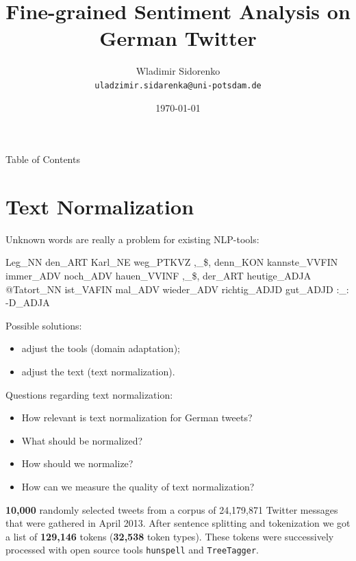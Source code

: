 \documentclass{beamer}
\title[Sentiment Analysis]{Fine-grained Sentiment Analysis on German Twitter}
\author[Sidorenko]{Wladimir Sidorenko\\ \texttt{uladzimir.sidarenka{@}uni-potsdam.de}}
\institute[Uni Potsdam]{University of Potsdam}
\date{\today}
\newcommand{\normquestions}[4]{
  Questions regarding text normalization:
  \begin{itemize}
    \item How relevant is text normalization for German tweets? \textit{#1}
    \item What should be normalized? \textit{#2}
    \item How should we normalize? \textit{#3}
    \item How can we measure the quality of text normalization? \textit{#4}
  \end{itemize}
}
\begin{document}
\begin{frame}{}
  \titlepage
\end{frame}

\begin{frame}{Table of Contents}
  \tableofcontents
\end{frame}

\section{Text Normalization}

\begin{frame}{}
  Unknown words are really a problem for existing NLP-tools:
  \begin{example}
    \alert{Leg\_NN} den\_ART Karl\_NE weg\_PTKVZ ,\_\$,
    \alert{denn\_KON} kannste\_VVFIN immer\_ADV noch\_ADV hauen\_VVINF
    ,\_\$, der\_ART heutige\_ADJA \alert{@Tatort\_NN} ist\_VAFIN
    mal\_ADV wieder\_ADV richtig\_ADJD gut\_ADJD :\_: \alert{-D\_ADJA}
  \end{example}
\end{frame}

\begin{frame}{}
  Possible solutions:
  \begin{itemize}
    \item<+-> adjust the tools (domain adaptation);
    \item<+->  adjust the text (text normalization).
  \end{itemize}
\end{frame}

\begin{frame}{}
  \normquestions{}{}{}{}
\end{frame}

\begin{frame}{}
  \textbf{10,000} randomly selected tweets from a corpus of 24,179,871 Twitter
  messages that were gathered in April 2013.  After sentence splitting and
  tokenization we got a list of \textbf{129,146} tokens (\textbf{32,538} token
  types).  These tokens were successively processed with open source tools
  \texttt{hunspell} and \texttt{TreeTagger}.
\end{frame}
\end{document}
